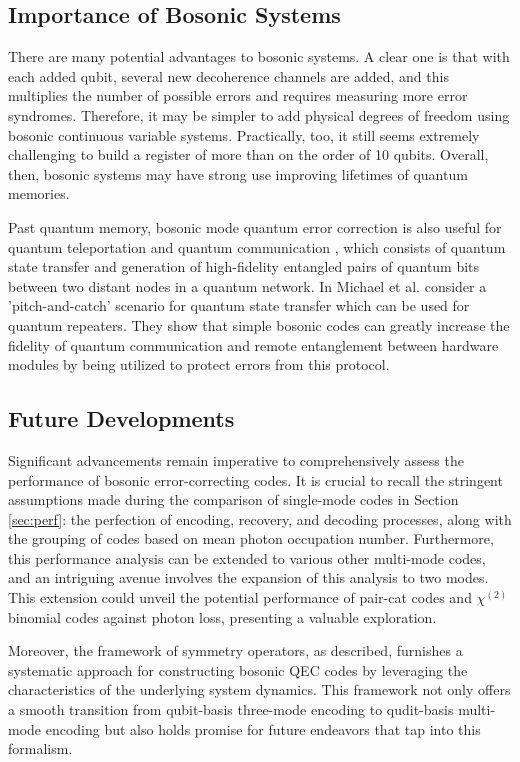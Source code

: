 \documentclass[11pt]{article}
\newcommand\0{\mathbf{0}}
\newcommand\<{\langle}
\renewcommand\>{\rangle}
\begin{document}
\subsection{Importance of Bosonic Systems}

There are many potential advantages to bosonic systems. A clear one is that with each added qubit, several new decoherence channels are added, and this multiplies the number of possible errors and requires measuring more error syndromes. Therefore, it may be simpler to add physical degrees of freedom using bosonic continuous variable systems. Practically, too, it still seems extremely challenging to build a register of more than on the order of 10 qubits. Overall, then, bosonic systems may have strong use improving lifetimes of quantum memories.

Past quantum memory, bosonic mode quantum error correction is also useful for quantum teleportation and quantum communication \cite{michael2016new}, which consists of quantum state transfer and generation of high-fidelity entangled pairs of quantum bits between two distant nodes in a quantum network. In \cite{michael2016new} Michael et al. consider a 'pitch-and-catch' scenario for quantum state transfer which can be used for quantum repeaters. They show that simple bosonic codes can greatly increase the fidelity of quantum communication and remote entanglement between hardware modules by being utilized to protect errors from this protocol.

\subsection{Future Developments}

Significant advancements remain imperative to comprehensively assess the performance of bosonic error-correcting codes. It is crucial to recall the stringent assumptions made during the comparison of single-mode codes in Section \ref{sec:perf}: the perfection of encoding, recovery, and decoding processes, along with the grouping of codes based on mean photon occupation number. Furthermore, this performance analysis can be extended to various other multi-mode codes, and an intriguing avenue involves the expansion of this analysis to two modes. This extension could unveil the potential performance of pair-cat codes and $\chi^{(2)}$ binomial codes against photon loss, presenting a valuable exploration.

Moreover, the framework of symmetry operators, as described, furnishes a systematic approach for constructing bosonic QEC codes by leveraging the characteristics of the underlying system dynamics. This framework not only offers a smooth transition from qubit-basis three-mode encoding to qudit-basis multi-mode encoding but also holds promise for future endeavors that tap into this formalism.
\end{document}
